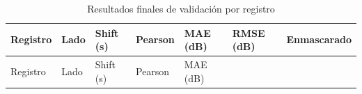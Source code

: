 \documentclass[
  spanish,
  a4paper,
  12pt,
  twoside]{memoir}
\begin{document}
\begin{longtable}[]{@{}
  >{\raggedright\arraybackslash}p{}
  >{\raggedright\arraybackslash}p{}
  >{\raggedleft\arraybackslash}p{}
  >{\raggedleft\arraybackslash}p{}
  >{\raggedleft\arraybackslash}p{}
  >{\raggedleft\arraybackslash}p{}
  >{\raggedleft\arraybackslash}p{}@{}}
\caption{Resultados finales de validación por
registro}\label{tbl-resultados-finales}\tabularnewline
\toprule\noalign{}
\begin{minipage}[b]{\linewidth}\raggedright
Registro
\end{minipage} & \begin{minipage}[b]{\linewidth}\raggedright
Lado
\end{minipage} & \begin{minipage}[b]{\linewidth}\raggedleft
Shift (s)
\end{minipage} & \begin{minipage}[b]{\linewidth}\raggedleft
Pearson
\end{minipage} & \begin{minipage}[b]{\linewidth}\raggedleft
MAE (dB)
\end{minipage} & \begin{minipage}[b]{\linewidth}\raggedleft
RMSE (dB)
\end{minipage} & \begin{minipage}[b]{\linewidth}\raggedleft
Enmascarado
\end{minipage} \\
\midrule\noalign{}
\endfirsthead
\toprule\noalign{}
\begin{minipage}[b]{\linewidth}\raggedright
Registro
\end{minipage} & \begin{minipage}[b]{\linewidth}\raggedright
Lado
\end{minipage} & \begin{minipage}[b]{\linewidth}\raggedleft
Shift (s)
\end{minipage} & \begin{minipage}[b]{\linewidth}\raggedleft
Pearson
\end{minipage} & \begin{minipage}[b]{\linewidth}\raggedleft
MAE (dB)
\end{minipage} & \begin{minipage}[b]{\linewidth}\raggedleft

\end{minipage}
\end{longtable}
\end{document}
